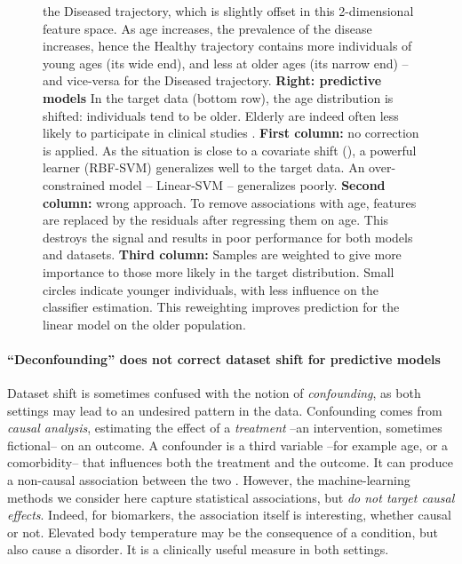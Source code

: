 \documentclass[a4paper,num-refs]{oup-contemporary}
\begin{document}
\begin{figure}[t!]
{  the Diseased trajectory, which is slightly offset in this 2-dimensional
  feature space. As age increases, the prevalence of the
  disease increases, hence the Healthy trajectory contains more
  individuals of
  young ages (its wide end), and less at older ages (its narrow end) -- and
  vice-versa for the Diseased trajectory.
  \textbf{Right: predictive models}
  In the target data (bottom row), the age distribution is shifted:
  individuals tend to be older. Elderly are indeed often less
  likely to participate in clinical studies \citep{heiat2002representation}.
  \textbf{First column:} no correction is applied. As the situation is close to
  a covariate shift (), a powerful learner (RBF-SVM)
  generalizes well to the target data. An over-constrained model -- Linear-SVM --
  generalizes poorly.
  \textbf{Second column:} wrong approach. To remove
  associations with age, features are replaced by the residuals after regressing
  them on age. This destroys the signal and results in poor performance for both
  models and datasets.
  \textbf{Third column:} Samples are weighted to
  give more importance to those more likely in the target
  distribution.  Small circles  indicate
  younger individuals, with less influence on the classifier estimation.
  This reweighting  improves prediction for the linear model on the older population.
}
\end{figure}


\paragraph{``Deconfounding'' does not correct dataset shift for
predictive models}
Dataset shift is sometimes confused with the notion of
\emph{confounding}, as both settings may lead to an undesired pattern in the data.
Confounding comes from \emph{causal analysis}, estimating
the effect of a \emph{treatment} --an intervention, sometimes fictional-- on an outcome.  A confounder is
a third variable --for example age, or a comorbidity-- that influences both the
treatment and the outcome. It can produce a non-causal association
between the two \citep[See][Chap. 7, for a precise definition]{hernan2020causal}.
%
However, the machine-learning methods we consider here capture statistical
associations, but \emph{do not target causal effects}.
%
Indeed, for biomarkers, the association itself is interesting, whether causal or not.
%
Elevated body temperature may be the consequence of a condition, but also
cause a disorder. It is a clinically useful measure in both settings.
\end{document}
